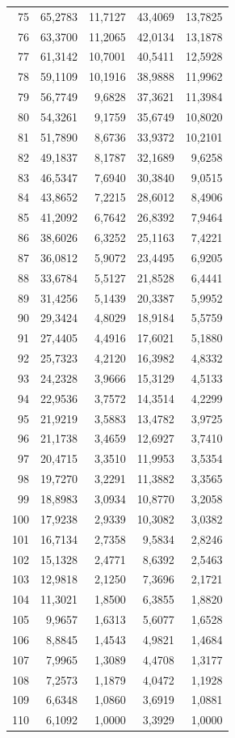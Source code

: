 \begin{small}
\begin{longtable}{rrrrr}
75 & 65,2783 & 11,7127 & 43,4069 & 13,7825 \\
76 & 63,3700 & 11,2065 & 42,0134 & 13,1878 \\
77 & 61,3142 & 10,7001 & 40,5411 & 12,5928 \\
78 & 59,1109 & 10,1916 & 38,9888 & 11,9962 \\
79 & 56,7749 & 9,6828 & 37,3621 & 11,3984 \\
80 & 54,3261 & 9,1759 & 35,6749 & 10,8020 \\
81 & 51,7890 & 8,6736 & 33,9372 & 10,2101 \\
82 & 49,1837 & 8,1787 & 32,1689 & 9,6258 \\
83 & 46,5347 & 7,6940 & 30,3840 & 9,0515 \\
84 & 43,8652 & 7,2215 & 28,6012 & 8,4906 \\
85 & 41,2092 & 6,7642 & 26,8392 & 7,9464 \\
86 & 38,6026 & 6,3252 & 25,1163 & 7,4221 \\
87 & 36,0812 & 5,9072 & 23,4495 & 6,9205 \\
88 & 33,6784 & 5,5127 & 21,8528 & 6,4441 \\
89 & 31,4256 & 5,1439 & 20,3387 & 5,9952 \\
90 & 29,3424 & 4,8029 & 18,9184 & 5,5759 \\
91 & 27,4405 & 4,4916 & 17,6021 & 5,1880 \\
92 & 25,7323 & 4,2120 & 16,3982 & 4,8332 \\
93 & 24,2328 & 3,9666 & 15,3129 & 4,5133 \\
94 & 22,9536 & 3,7572 & 14,3514 & 4,2299 \\
95 & 21,9219 & 3,5883 & 13,4782 & 3,9725 \\
96 & 21,1738 & 3,4659 & 12,6927 & 3,7410 \\
97 & 20,4715 & 3,3510 & 11,9953 & 3,5354 \\
98 & 19,7270 & 3,2291 & 11,3882 & 3,3565 \\
99 & 18,8983 & 3,0934 & 10,8770 & 3,2058 \\
100 & 17,9238 & 2,9339 & 10,3082 & 3,0382 \\
101 & 16,7134 & 2,7358 & 9,5834 & 2,8246 \\
102 & 15,1328 & 2,4771 & 8,6392 & 2,5463 \\
103 & 12,9818 & 2,1250 & 7,3696 & 2,1721 \\
104 & 11,3021 & 1,8500 & 6,3855 & 1,8820 \\
105 & 9,9657 & 1,6313 & 5,6077 & 1,6528 \\
106 & 8,8845 & 1,4543 & 4,9821 & 1,4684 \\
107 & 7,9965 & 1,3089 & 4,4708 & 1,3177 \\
108 & 7,2573 & 1,1879 & 4,0472 & 1,1928 \\
109 & 6,6348 & 1,0860 & 3,6919 & 1,0881 \\
110 & 6,1092 & 1,0000 & 3,3929 & 1,0000 \\
\end{longtable}
\end{small}
